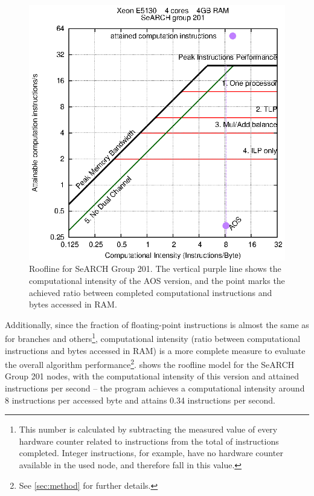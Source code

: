 \documentclass[abstract=on,9pt,twocolumn]{scrartcl}
\begin{document}
\begin{figure}[!p]
	\begin{center}
		\includegraphics[width=\columnwidth]{images/report.april/rooflineAOS.eps}
	\end{center}
	\caption{Roofline for SeARCH Group 201. The vertical purple line shows the computational intensity of the AOS version, and the point marks the achieved ratio between completed computational instructions and bytes accessed in RAM.}
	\label{fig:rooflineAOS}
\end{figure}

Additionally, since the fraction of floating-point instructions is almost the same as for branches and others\footnote{This number is calculated by subtracting the  measured value of every hardware counter related to instructions from the total of instructions completed. Integer instructions, for example, have no hardware counter available in the used node, and therefore fall in this value.}, computational intensity (ratio between computational instructions and bytes accessed in RAM) is a more complete measure to evaluate the overall algorithm performance\footnote{See \cref{sec:method} for further details.}.  shows the roofline model for the SeARCH Group 201 nodes, with the computational intensity of this version and attained instructions per second -- the program achieves a computational intensity around 8 instructions per accessed byte and attains 0.34 instructions per second.
\end{document}

